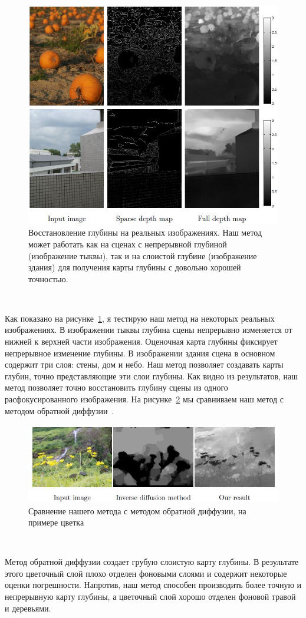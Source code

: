 \begin{figure}[H]
	\centering
	\includegraphics[width=0.7\linewidth]{pics/comparison}
	\caption{Восстановление глубины на реальных изображениях. Наш метод может работать как на сценах с непрерывной глубиной (изображение тыквы), так и на слоистой глубине (изображение здания) для получения карты глубины с довольно хорошей точностью.}
	\label{fig:comparison}
\end{figure}\

Как показано на рисунке~\ref{fig:comparison}, я тестирую наш метод на некоторых реальных изображениях. В изображении тыквы глубина сцены непрерывно изменяется от нижней к верхней части изображения. Оценочная карта глубины фиксирует непрерывное изменение глубины. В изображении здания сцена в основном содержит три слоя: стены, дом и небо. Наш метод позволяет создавать карты глубин, точно представляющие эти слои глубины. Как видно из результатов, наш метод позволяет точно восстановить глубину сцены из одного расфокусированного изображения. На рисунке~\ref{fig:flower} мы сравниваем наш метод с методом обратной диффузии~\cite{Proc}.

\begin{figure}[H]
	\centering
	\includegraphics[width=1\linewidth]{pics/flower}
	\caption{Сравнение нашего метода с методом обратной диффузии, на примере цветка}
	\label{fig:flower}
\end{figure}\

Метод обратной диффузии создает грубую слоистую карту глубины. В результате этого цветочный слой плохо отделен фоновыми слоями и содержит некоторые оценки погрешности. Напротив, наш метод способен производить более точную и непрерывную карту глубины, а цветочный слой хорошо отделен фоновой травой и деревьями.